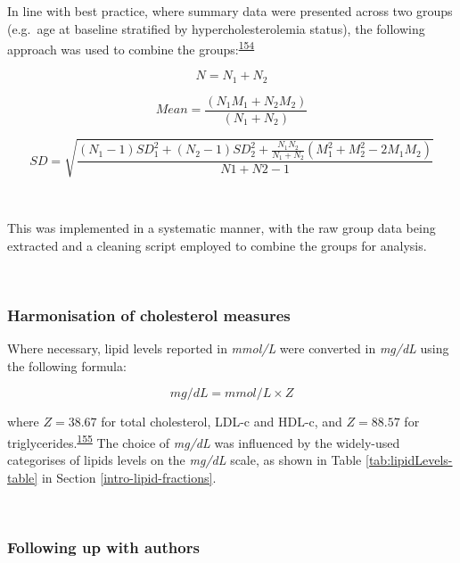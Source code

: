 \documentclass[a4paper, twoside]{templates/ociamthesis}
\begin{document}
In line with best practice, where summary data were presented across two groups (e.g.~age at baseline stratified by hypercholesterolemia status), the following approach was used to combine the groups:\textsuperscript{\protect\hyperlink{ref-higgins2019}{154}}

\begin{equation}
N = N_1 + N_2
  \label{eq:combiningGroups1}
\end{equation}

\begin{equation}
Mean = \frac{(N_1M_1 + N_2M_2)}{(N_1 + N_2)}
  \label{eq:combiningGroups2}
\end{equation}

\begin{equation}
SD = \sqrt{\frac{(N_1-1)SD_1^2 + (N_2-1)SD_2^2 + \frac{N_1N_2}{N_1 + N_2}(M_1^2 + M_2^2 - 2M_1M_2)}{N1 + N2 -1}}
  \label{eq:combiningGroups3}
\end{equation}

~

This was implemented in a systematic manner, with the raw group data being extracted and a cleaning script employed to combine the groups for analysis.

~

\hypertarget{harmonisation-of-cholesterol-measures}{%
\subsubsection{Harmonisation of cholesterol measures}\label{harmonisation-of-cholesterol-measures}}

Where necessary, lipid levels reported in \emph{mmol/L} were converted in \emph{mg/dL} using the following formula:

\begin{equation} 
  mg/dL = mmol/L \times{} Z
  \label{eq:lipidConversion}
\end{equation}

where \(Z = 38.67\) for total cholesterol, LDL-c and HDL-c, and \(Z = 88.57\) for triglycerides.\textsuperscript{\protect\hyperlink{ref-rugge2011}{155}} The choice of \emph{mg/dL} was influenced by the widely-used categorises of lipids levels on the \emph{mg/dL} scale, as shown in Table \ref{tab:lipidLevels-table} in Section \ref{intro-lipid-fractions}.

~

\hypertarget{contacting-authors}{%
\subsubsection{Following up with authors}\label{contacting-authors}}
\end{document}
